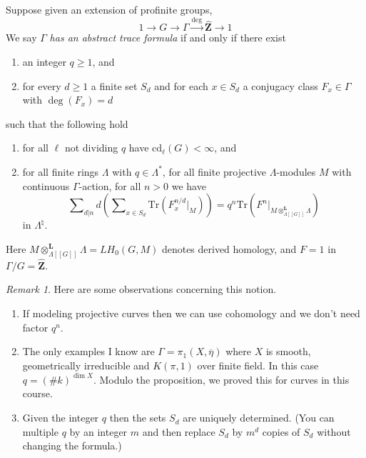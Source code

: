 \documentclass{stacks-project}
\theoremstyle{plain}
\theoremstyle{definition}
\theoremstyle{remark}
\newtheorem{remark}[subsection]{Remark}
\numberwithin{equation}{subsection}
\begin{document}
\noindent
Suppose given an extension of profinite groups,
$$
1 \to G \to \Gamma \xrightarrow{\deg} \widehat{\mathbf{Z}} \to 1
$$
We say $\Gamma$ {\it has an abstract trace formula} if and only if
there exist
\begin{enumerate}
\item an integer $q\geq 1$, and
\item for every $d\geq 1$ a finite set $S_d$ and for each $x\in S_d$ a
conjugacy class $F_x \in \Gamma$ with $\deg(F_x) = d$
\end{enumerate}
such that the following hold
\begin{enumerate}
\item for all $\ell$ not dividing $q$ have $\text{cd}_\ell(G)<\infty$, and
\item for all finite rings $\Lambda$ with $q\in \Lambda^*$,
for all finite projective $\Lambda$-modules $M$ with continuous
$\Gamma$-action, for all $n > 0$ we have
$$
\sum\nolimits_{d|n}d \left(
\sum\nolimits_{x \in S_d}
\text{Tr}( F_x^{n/d} |_M)
\right)
=
q^n \text{Tr}(F^n|_{M \otimes_{\Lambda[[G]]}^{\mathbf{L}}\Lambda})
$$
in $\Lambda^\natural$.
\end{enumerate}
Here $M \otimes_{\Lambda[[G]]}^{\mathbf{L}}\Lambda = LH_0(G, M)$ denotes
derived homology, and $F=1$ in $\Gamma/G = \widehat{\mathbf{Z}}$.

\begin{remark}
\label{remark-abstract-trace-formula}
Here are some observations concerning this notion.
\begin{enumerate}
\item If modeling projective curves then we can use cohomology and we
don't need factor $q^n$.
\item The only examples I know are $\Gamma = \pi_1(X, \overline \eta)$
where $X$ is smooth, geometrically irreducible and $K(\pi, 1)$ over finite
field. In this case $q = (\# k)^{\dim X}$. Modulo the proposition, we proved
this for curves in this course.
\item Given the integer $q$ then the sets $S_d$ are uniquely
determined. (You can multiple $q$ by an integer $m$ and then replace $S_d$ by
$m^d$ copies of $S_d$ without changing the formula.)
\end{enumerate}
\end{remark}
\end{document}
